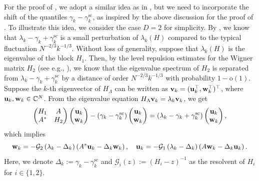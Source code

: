\documentclass[10pt,reqno]{amsart}
\numberwithin{equation}{section}
\numberwithin{figure}{section}
\theoremstyle{plain} %
\theoremstyle{definition} %
\newcommand{\VV}{H_{\Lambda}}
\newcommand{\C}{\mathbb{C}}
\newcommand{\cG}{{\mathcal G}}
\newcommand{\pa}[1]{\left({#1}\right)}
\newcommand{\bu}{{\bf{u}}}
\newcommand{\bv}{{\bf{v}}}
\newcommand{\bw}{{\bf{w}}}
\newcommand{\oo}{\mathrm{o}}
\numberwithin{equation}{section}
\begin{document}
For the proof of , we adopt a similar idea as in \cite[Section 7]{stone2024randommatrixmodelquantum}, but we need to incorporate the shift of the quantiles $\gamma_k-\gamma_k^{\mathrm{sc}}$, as inspired by the above discussion for the proof of . 
To illustrate this idea, we consider the case $D=2$ for simplicity. By , we know that $\lambda_k-\gamma_k + \gamma_k^{\mathrm{sc}}$ is a small perturbation of $\lambda_k(H)$ compared to the typical fluctuation $N^{-2/3}k^{-1/3}$.
Without loss of generality, suppose that $\lambda_k(H)$ is the eigenvalue of the block $H_1$. 
Then, by the level repulsion estimates for the Wigner matrix $H_2$ (see e.g.,  \cite{BENIGNI2022108109}), we know that the eigenvalue spectrum of $H_2$ is separated from $\lambda_k-\gamma_k + \gamma_k^{\mathrm{sc}}$ by a distance of order $N^{-2/3}k^{-1/3}$ with probability $1-\oo(1)$.
Suppose the $k$-th eigenvector of $\VV$ can be written as $\bv_k=(\bu_k^\top, \bw_k^\top)^\top$, where $\bu_k,\bw_k\in \C^N$.
From the eigenvalue equation $\VV \bv_k =\lambda_k \bv_k$, we get 
\begin{equation*}
        \begin{pmatrix}
            H_1 & A\\
            A^* & H_2
        \end{pmatrix}\begin{pmatrix}
    \bu_k\\
    \bw_k
\end{pmatrix}
-\left(\gamma_k - \gamma_k^{\mathrm{sc}}\right) \begin{pmatrix}
    \bu_k\\
    \bw_k
\end{pmatrix}
=\pa{\lambda_k- \gamma_k + \gamma_k^{\mathrm{sc}} }\begin{pmatrix}
    \bu_k\\
    \bw_k
\end{pmatrix},
\end{equation*}
which implies 
\begin{equation}\label{eq:bwk}
\bw_k=-\cG_2\pa{\lambda_k- \Delta_k}\pa{A^*\bu_k - \Delta_k\bw_k},
\quad \bu_k=-\cG_1 \pa{\lambda_k- \Delta_k} \pa{A\bw_k- \Delta_k\bu_k}.
\end{equation}
Here, we denote $\Delta_k:=\gamma_k -\gamma_k^{\mathrm{sc}}$ and $\cG_i (z) :=\pa{H_i-z}^{-1}$ as the resolvent of $H_i$ for $i\in\{1,2\}$. 
\end{document}
